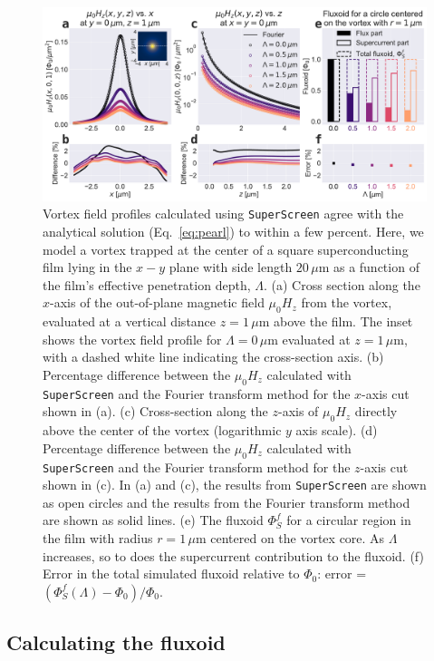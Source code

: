 \documentclass[final,3p,times,twocolumn]{elsarticle}
\newcommand{\inline}[1]{\texttt{#1}\xspace}
\newcommand{\SuperScreen}{\inline{SuperScreen}}
\newcommand{\um}{\mu\mathrm{m}}
\begin{document}
\begin{figure}[h!]
    \centering
    \includegraphics[width=\textwidth]{examples/images/pearl.pdf}
    \caption{Vortex field profiles calculated using \SuperScreen agree with the analytical solution (Eq.~\ref{eq:pearl}) to within a few percent. Here, we model a vortex trapped at the center of a square superconducting film lying in the $x-y$ plane with side length $20\,\um$ as a function of the film's effective penetration depth, $\Lambda$. (a) Cross section along the $x$-axis of the out-of-plane magnetic field $\mu_0H_z$ from the vortex, evaluated at a vertical distance $z=1\,\um$ above the film. The inset shows the vortex field profile for $\Lambda=0\,\um$ evaluated at $z=1\,\um$, with a dashed white line indicating the cross-section axis. (b) Percentage difference between the $\mu_0H_z$ calculated with \SuperScreen and the Fourier transform method for the $x$-axis cut shown in (a). (c) Cross-section along the $z$-axis of $\mu_0H_z$ directly above the center of the vortex (logarithmic $y$ axis scale). (d) Percentage difference between the $\mu_0H_z$ calculated with \SuperScreen and the Fourier transform method for the $z$-axis cut shown in (c). In (a) and (c), the results from \SuperScreen are shown as open circles and the results from the Fourier transform method are shown as solid lines. (e) The fluxoid $\Phi_S^f$ for a circular region in the film with radius $r=1\,\um$ centered on the vortex core. As $\Lambda$ increases, so to does the supercurrent contribution to the fluxoid. (f) Error in the total simulated fluxoid relative to $\Phi_0$: error = $(\Phi_S^f(\Lambda) - \Phi_0) / \Phi_0$.}
    \label{fig:pearl}
\end{figure}

\subsection{Calculating the fluxoid}
\label{section:examples:fluxoid}
\end{document}
